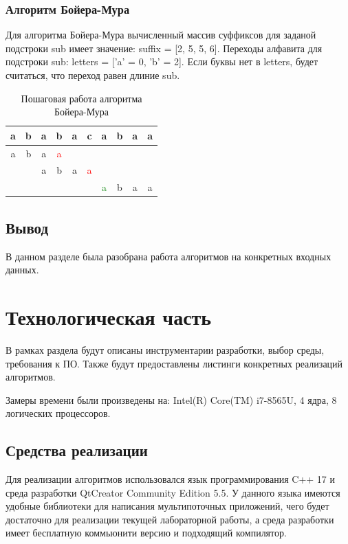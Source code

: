 \documentclass[a4paper,12pt]{report}
\begin{document}
	\subsection{Алгоритм Бойера-Мура}
	
		Для алгоритма Бойера-Мура вычисленный массив суффиксов для заданой  подстроки sub имеет значение:
		suffix = [2, 5, 5, 6].
		Переходы алфавита для подстроки sub:
		letters = ['a' = 0, 'b' = 2].
		Если буквы нет в letters, будет считаться, что переход равен длиние sub.
			
			\begin{longtable}{| c | c | c | c | c | c | c | c | c | c | }
				\caption{Пошаговая работа алгоритма Бойера-Мура}
				\label{table:bm}\\
				\hline
				a&b&a&b&a&c&a&b&a&a \\
				\hline
				\hline
				a&b&a&\textcolor{red}{a}&&&&&&\\
				\hline
				&&a&b&a&\textcolor{red}{a}&&&&\\
				\hline
				&&&&&&\textcolor{green}{a}&b&a&a\\
				\hline
			\end{longtable}
	
	\section{Вывод}

		В данном разделе была разобрана работа алгоритмов на конкретных входных данных.

    \newpage

    \chapter{Технологическая часть}
    
        \label{sec:tecnologic_part}
			В рамках раздела будут описаны инструментарии разработки, выбор среды, требования к ПО. 
			Также будут предоставлены листинги конкретных реализаций алгоритмов.
			
			Замеры времени были произведены на: Intel(R) Core(TM) i7-8565U, 4 ядра, 8 логических процессоров.
	
	\section{Средства реализации}
			
			Для реализации алгоритмов использовался язык программирования C++ 17 и среда разработки QtCreator Community Edition 5.5. 
        	У данного языка имеются удобные библиотеки для написания мультипоточных приложений, чего будет достаточно для реализации текущей лабораторной работы, а среда разработки имеет бесплатную коммьюнити версию и подходящий компилятор.
        	
\end{document}
